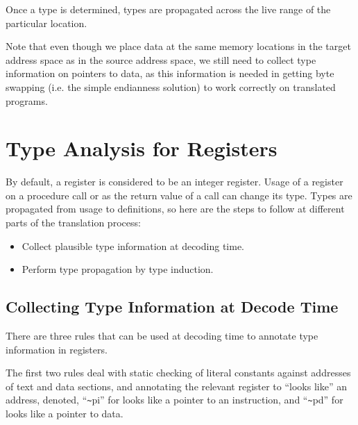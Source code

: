 \centerfigbegin
{}

Once a type is determined, types are propagated across the live range 
of the particular location.

Note that even though we place data at the same memory locations
in the target address space as in the source address space, we 
still need to collect type information on pointers to data, as 
this information is needed in getting byte swapping (i.e. the 
simple endianness solution) to work correctly on translated 
programs.


\section{Type Analysis for Registers}
By default, a register is considered to be an integer 
register.  Usage of a register on a procedure call or 
as the return value of a call can change its type.  
Types are propagated from usage to definitions, so here are 
the steps to follow at different parts of the translation 
process: 

\begin{itemize}
\item Collect plausible type information at decoding time.
\item Perform type propagation by type induction.
\end{itemize}


\subsection{Collecting Type Information at Decode Time}
There are three rules that can be used at decoding time 
to annotate type information in registers.  

The first two rules deal with static checking of literal 
constants against addresses of text and data sections, and 
annotating the relevant register to ``looks like'' an address, 
denoted, ``\verb!~!pi'' for looks like a pointer to an instruction, 
and ``\verb!~!pd'' for looks like a pointer to data.  

